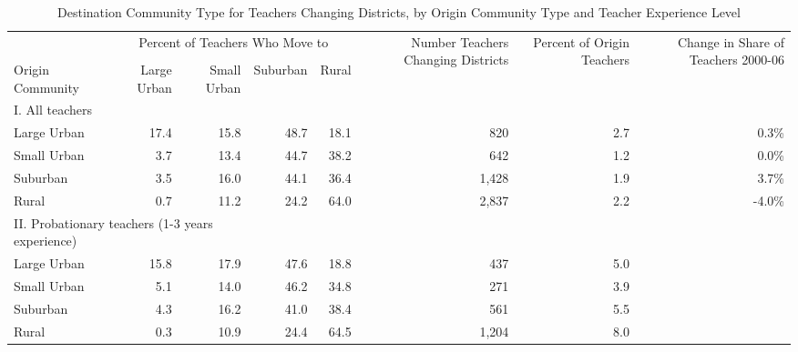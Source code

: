 \documentclass[12pt,]{article}
\begin{document}
\begin{sidewaystable}[htbp]
\centering
\begin{tabular}{lrrrrrrr}
  \hline
 & \multicolumn{4}{c}{\multirow{2}{*}{Percent of Teachers Who Move to}} & \multirow{4}{*}{\parbox{0.09\linewidth}{Number Teachers Changing Districts}} & \multirow{4}{*}{\parbox{0.07\linewidth}{Percent of Origin Teachers}} & \multirow{4}{*}{\parbox{0.09\linewidth}{Change in Share of Teachers 2000-06}}\\
 & \multicolumn{4}{c}{} & & & \\ \cline{2-5}
& & & & & & & \\
Origin Community & Large Urban & Small Urban & Suburban & Rural &  &  &  \\ 
  \hline
I. All teachers & & & & & & & \\
\quad Large Urban & 17.4 & 15.8 & 48.7 & 18.1 & 820 & 2.7 & 0.3\% \\ 
  \quad Small Urban & 3.7 & 13.4 & 44.7 & 38.2 & 642 & 1.2 & 0.0\% \\ 
  \quad Suburban & 3.5 & 16.0 & 44.1 & 36.4 & 1,428 & 1.9 & 3.7\% \\ 
  \quad Rural & 0.7 & 11.2 & 24.2 & 64.0 & 2,837 & 2.2 & -4.0\% \\ 
\multicolumn{3}{l}{II. Probationary teachers (1-3 years experience)} & & & & & \\
  \quad Large Urban & 15.8 & 17.9 & 47.6 & 18.8 & 437 & 5.0 &  \\ 
  \quad Small Urban & 5.1 & 14.0 & 46.2 & 34.8 & 271 & 3.9 &  \\ 
  \quad Suburban & 4.3 & 16.2 & 41.0 & 38.4 & 561 & 5.5 &  \\ 
  \quad Rural & 0.3 & 10.9 & 24.4 & 64.5 & 1,204 & 8.0 &  \\ 
   \hline
\end{tabular}
\caption{Destination Community Type for Teachers Changing Districts, by Origin Community Type and Teacher Experience Level} 
\label{tbl:markov}
\end{sidewaystable}
\end{document}
